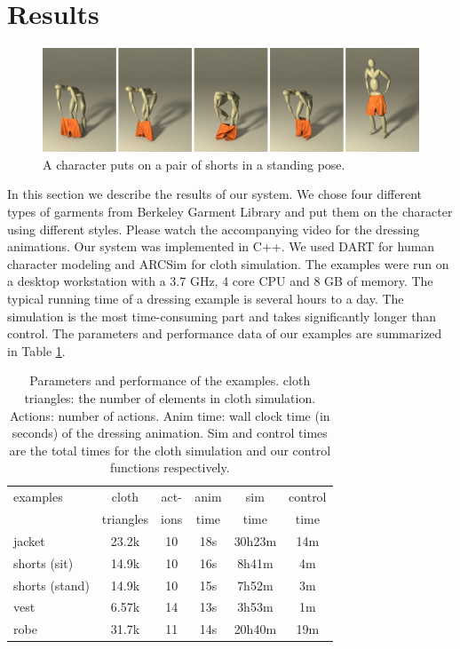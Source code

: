 \section{Results}



\begin{figure}[!t]
  \centering
  \includegraphics[width=\textwidth]{images/shortsStanding}
  \caption{A character puts on a pair of shorts in a standing pose.}
  \label{fig:shorts2}
\end{figure}
In this section we describe the results of our system. We chose four different types of garments from Berkeley Garment Library and put them on the character using different styles. Please watch the accompanying video for the dressing animations. Our system was implemented in C++. We used DART \cite{Liu:2012:STM} for human character modeling and ARCSim \cite{Narain:2012:AAR} for cloth simulation. The examples were run on a desktop workstation with a 3.7 GHz, 4 core CPU and 8 GB of memory. The typical running time of a dressing example is several hours to a day. The simulation is the most time-consuming part and takes significantly longer than control. The parameters and performance data of our examples are summarized in Table
 \ref{table:data}. 

\begin{table}
  \centering
  \begin{tabular}{|l|c|c|c|c|c|}
    \hline
    examples 		& cloth 	& act- 	& anim	& sim 		& control \\
                        & triangles & 	ions	& time 	& time 		& time \\
    \hline
    jacket 		& 23.2k  	& 10		& 18s 	&30h23m	&  14m  \\
    shorts (sit) 	& 14.9k 	& 10		& 16s 	&  8h41m 	& 4m \\
    shorts (stand)	& 14.9k 	& 10		& 15s	&  7h52m	& 3m \\
    vest 		& 6.57k		& 14		& 13s	&  3h53m	& 1m   \\
    robe 		& 31.7k 	& 11		& 14s			& 20h40m		& 19m  \\
    \hline
  \end{tabular}
  \caption{Parameters and performance of the examples. cloth triangles: the number of elements in cloth simulation. Actions: number of actions. Anim time: wall clock time (in seconds) of the dressing animation. Sim and control times are the total times for the cloth simulation and our control functions respectively.}
  \label{table:data}
\end{table}

